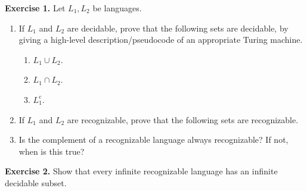 \documentclass[10pt]{article}
\begin{document}
\textbf{Exercise 1.} Let $L_1, L_2$ be languages.
\begin{enumerate}[label=(\alph*)]
 
\item If $L_1$ and $L_2$ are decidable, prove that the following sets are decidable, by giving a high-level description/pseudocode of an appropriate Turing machine.
\begin{multicols}{3}
\begin{enumerate}[label=(\roman*)]
\item $L_1 \cup L_2$.
\item $L_1 \cap L_2$.
\item $L_1^\text{c}$.
\end{enumerate}
\end{multicols}

 \item If $L_1$ and $L_2$ are recognizable, prove that the following sets are recognizable.
\begin{enumerate}[label=(\roman*)]
\end{enumerate}
\item Is the complement of a recognizable language always recognizable? If not, when is this true?
\end{enumerate}

\noindent \hrulefill

\textbf{Exercise 2.} Show that every infinite recognizable language has an infinite decidable subset.
\end{document}
